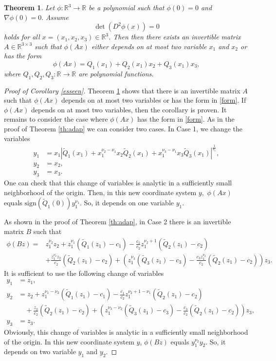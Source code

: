 \documentclass[10pt,a4paper]{amsart}
\newtheorem{theorem}{Theorem}
\begin{document}
\begin{theorem}\label{Bon}
Let  $\phi:\mathbb{R}^3\to \mathbb{R}$ be a  polynomial  such that $\phi(0)=0$ and $\nabla \phi(0)=0.$ Assume  $$\det{(D^2\phi(x))}=0$$
holds   for all $x=(x_1,x_2,x_3)\in \mathbb{R}^3$.  Then
then there exists an  invertible matrix $A\in \mathbb{R}^{3\times 3}$ such that $\phi(Ax)$ either depends on at most two  variable $x_1$ and $x_2$ or has the form
\begin{equation}\label{form}
\phi(Ax)=Q_1(x_1)+Q_2(x_1)x_2+Q_3(x_1)x_3,
\end{equation}
where $Q_1,Q_2,Q_3:\mathbb{R}\to \mathbb{R}$ are polynomial functions.
\end{theorem}

\begin{proof}[{Proof of Corollary \ref{esseen}}] Theorem \ref{Bon} shows that there is an invertible matrix $A$ such that $\phi(Ax)$ depends on at most two variables or has the form in \eqref{form}. If $\phi(Ax)$ depends on at most two variables, then the corollary is proven. It remains  to consider the case  where  $\phi(Ax)$ has the form in  \eqref{form}. As in the proof of Theorem \ref{th:adap} we can consider two cases. In Case 1, we  change the variables
\begin{align*}
y_1&=x_1|\tilde Q_1(x_1)+x_1^{\nu_2-\nu_1}x_2 \tilde{Q}_2(x_1)+x_1^{\nu_3-\nu_1}x_3\tilde{Q}_3(x_1)|^\frac1{\nu_1},\\
y_2&=x_2,\\
y_3&=x_3.
\end{align*}
One can check that this change of variables is analytic in a sufficiently small neighborhood of the origin.
 Then, in this new coordinate system $y,$ $\phi(Ax)$ equals $\mathrm{sign}(\tilde Q_1(0))y_1^{\nu_1}.$ So, it depends on one variable $y_1$.


As shown in the proof of Theorem \ref{th:adap}, in Case 2 there is an invertible matrix $B$ such that
\begin{align*}
\phi(Bz)=&z_1^{\nu_2}z_2+z_1^{\nu_1}(\tilde Q_1(z_1)-c_1)-\frac{c_1}{c_2}z_1^{\nu_2+1}(\tilde Q_2(z_1)-c_2)\\ &+\frac{z_1^{\nu_2}z_2}{c_2}(\tilde Q_2(z_1)-c_2)+\left(z_1^{\nu_3}(\tilde Q_3(z_1)-c_3)-\frac{c_3z_1^{\nu_2} }{c_2}(\tilde Q_2(z_1)-c_2)\right)z_3.
\end{align*}
 It is sufficient to use the following change of variables
 \begin{align*}
 y_1&=z_1,\\
  y_2&= z_2+z_1^{\nu_1-\nu_2}(\tilde Q_1(z_1)-c_1)-\frac{c_1}{c_2}z_1^{\nu_2+1-\nu_1}(\tilde Q_2(z_1)-c_2) \\ &\quad +\frac{z_2}{c_2}(\tilde Q_2(z_1)-c_2)+\left(z_1^{\nu_3-\nu_2}(\tilde Q_3(z_1)-c_3)-\frac{c_3 }{c_2}(\tilde Q_2(z_1)-c_2)\right)z_3,\\
  y_3&=z_3.
 \end{align*}
Obviously, this change of variables is  analytic  in a sufficiently small neighborhood of the origin. In this new coordinate system $y$, $\phi(Bz)$ equals $ y_1^{\nu_2} y_2.$
So, it depends on two variable $y_1$ and $y_2$.


  \end{proof}
\end{document}
